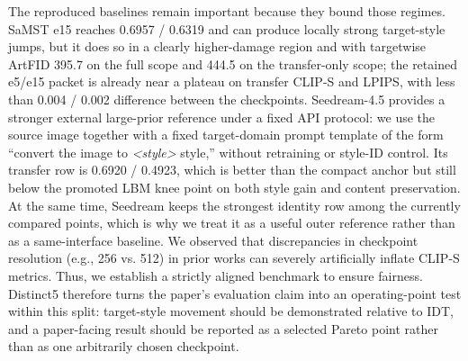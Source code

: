 \documentclass[letterpaper]{article}
\begin{document}
The reproduced baselines remain important because they bound those regimes. SaMST e15 reaches 0.6957 / 0.6319 and can produce locally strong target-style jumps, but it does so in a clearly higher-damage region and with targetwise ArtFID 395.7 on the full scope and 444.5 on the transfer-only scope; the retained e5/e15 packet is already near a plateau on transfer CLIP-S and LPIPS, with less than 0.004 / 0.002 difference between the checkpoints. Seedream-4.5 provides a stronger external large-prior reference under a fixed API protocol: we use the source image together with a fixed target-domain prompt template of the form ``convert the image to \textit{<style>} style,'' without retraining or style-ID control. Its transfer row is 0.6920 / 0.4923, which is better than the compact anchor but still below the promoted LBM knee point on both style gain and content preservation. At the same time, Seedream keeps the strongest identity row among the currently compared points, which is why we treat it as a useful outer reference rather than as a same-interface baseline. We observed that discrepancies in checkpoint resolution (e.g., 256 vs. 512) in prior works can severely artificially inflate CLIP-S metrics. Thus, we establish a strictly aligned benchmark to ensure fairness. Distinct5 therefore turns the paper's evaluation claim into an operating-point test within this split: target-style movement should be demonstrated relative to IDT, and a paper-facing result should be reported as a selected Pareto point rather than as one arbitrarily chosen checkpoint.
\end{document}
